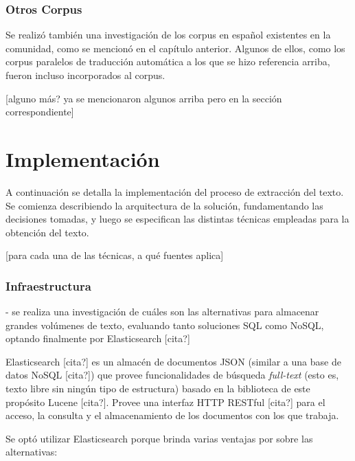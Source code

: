 \subsubsection{Otros Corpus}

Se realizó también una investigación de los corpus en español existentes en la comunidad, como se
mencionó en el capítulo anterior. Algunos de ellos, como los corpus paralelos de traducción
automática a los que se hizo referencia arriba, fueron incluso incorporados al corpus.

[alguno más? ya se mencionaron algunos arriba pero en la sección correspondiente]


\section{Implementación}

A continuación se detalla la implementación del proceso de extracción del texto. Se comienza
describiendo la arquitectura de la solución, fundamentando las decisiones tomadas, y luego se
especifican las distintas técnicas empleadas para la obtención del texto.

[para cada una de las técnicas, a qué fuentes aplica]

\subsubsection{Infraestructura}

- se realiza una investigación de cuáles son las alternativas para almacenar grandes volúmenes de
  texto, evaluando tanto soluciones SQL como NoSQL, optando finalmente por Elasticsearch [cita?]

Elasticsearch [cita?] es un almacén de documentos JSON (similar a una base de datos NoSQL [cita?])
que provee funcionalidades de búsqueda \textit{full-text} (esto es, texto libre sin ningún tipo de
estructura) basado en la biblioteca de este propósito Lucene [cita?]. Provee una interfaz HTTP
RESTful [cita?] para el acceso, la consulta y el almacenamiento de los documentos con los que
trabaja.

Se optó utilizar Elasticsearch porque brinda varias ventajas por sobre las alternativas:

